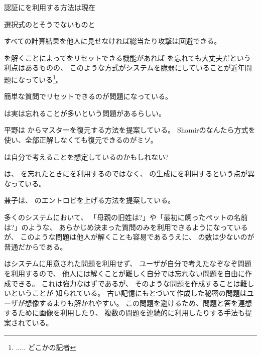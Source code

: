 \documentclass[twoside]{wiss}
\begin{document}
認証に{\SQ}を利用する方法は現在

選択式のとそうでないものと

すべての計算結果を他人に見せなければ総当たり攻撃は回避できる。

{\SQ}を解くことによって{\PW}をリセットできる機能があれば
{\PW}を忘れても大丈夫だという利点はあるものの、
このような方式がシステムを脆弱にしていることが近年問題になっている\footnote{
  ..... どこかの記者
}。

簡単な質問でリセットできるのが問題になっている。

{\SQ}は実は忘れることが多いという問題があるらしい。

平野\cite{平野亮:2011-11-07}は
{\SQ}からマスター{\PW}を復元する方法を提案している。
Shamirのなんたら方式を使い、全部正解しなくても復元できるのがミソ。

{\PW}は自分で考えることを想定しているのかもしれない?


{\EP}は、
{\PW}を忘れたときに{\SQ}を利用するのではなく、
{\PW}の生成に{\SQ}を利用するという点が異なっている。

兼子は、
{\SQ}のエントロピを上げる方法を提案している\cite{Kaneko}。

多くのシステムにおいて、
「母親の旧姓は?」や「最初に飼ったペットの名前は?」のような、
あらかじめ決まった質問のみを利用できるようになっているが、
このような問題は他人が解くことも容易であるうえに、
{\SQ}の数は少ないのが普通だからである\cite{Rabkin:2008:PKQ:1408664.1408667}。

{\EP}はシステムに用意された問題を利用せず、
ユーザが自分で考えたなぞなぞ問題を利用するので、
他人には解くことが難しく自分では忘れない問題を自由に作成できる。
これは強力なはずであるが、
そのような問題を作成することは難しいということが
知られている\cite{Just:2009:PCC:1572532.1572543}\cite{Schechter:2009:NSM:1607723.1608145}。
%
%
%
古い記憶にもとづいて作成した秘密の問題はユーザが想像するよりも解かれやすい。
この問題を避けるため、問題と答を連想するために画像を利用したり、
複数の問題を連続的に利用したりする手法も提案されている\cite{Renaud:2010:PQE:2146303.2146318}。
\end{document}
